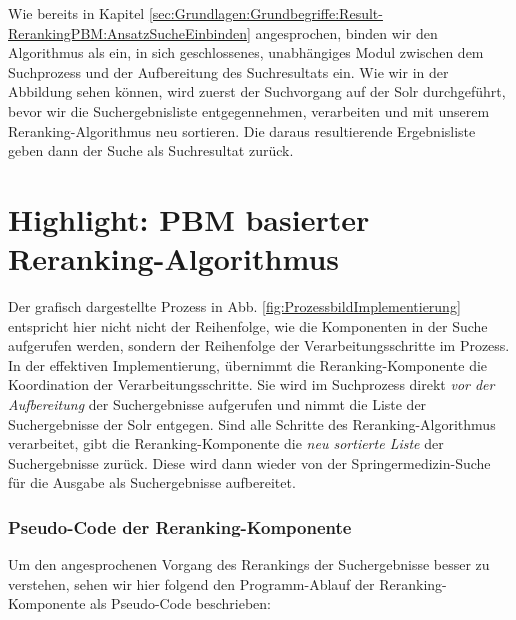 Wie bereits in Kapitel \ref{sec:Grundlagen:Grundbegriffe:Result-RerankingPBM:AnsatzSucheEinbinden} angesprochen, binden wir den Algorithmus als ein, in sich geschlossenes, unabhängiges Modul zwischen dem Suchprozess und der Aufbereitung des Suchresultats ein. Wie wir in der Abbildung sehen können, wird zuerst der Suchvorgang auf der Solr durchgeführt, bevor wir die Suchergebnisliste entgegennehmen, verarbeiten und mit unserem Reranking-Algorithmus neu sortieren. Die daraus resultierende Ergebnisliste geben dann der Suche als Suchresultat zurück. 

\section{Highlight: PBM basierter Reranking-Algorithmus}
\label{sec:Implementierung:PBM}

Der grafisch dargestellte Prozess in Abb. \ref{fig:ProzessbildImplementierung} entspricht hier nicht nicht der Reihenfolge, wie die Komponenten in der Suche aufgerufen werden, sondern der Reihenfolge der Verarbeitungsschritte im Prozess. In der effektiven Implementierung, übernimmt die Reranking-Komponente die Koordination der Verarbeitungsschritte. Sie wird im Suchprozess direkt \textit{vor der Aufbereitung} der Suchergebnisse aufgerufen und nimmt die Liste der Suchergebnisse der Solr entgegen. Sind alle Schritte des Reranking-Algorithmus verarbeitet, gibt die Reranking-Komponente die \textit{neu sortierte Liste} der Suchergebnisse zurück. Diese wird dann wieder von der Springermedizin-Suche für die Ausgabe als Suchergebnisse aufbereitet.

\subsubsection{Pseudo-Code der Reranking-Komponente}
\label{sec:Implementierung:PBM:Pseudocode}

Um den angesprochenen Vorgang des Rerankings der Suchergebnisse besser zu verstehen, sehen wir hier folgend den Programm-Ablauf der Reranking-Komponente als Pseudo-Code beschrieben:

